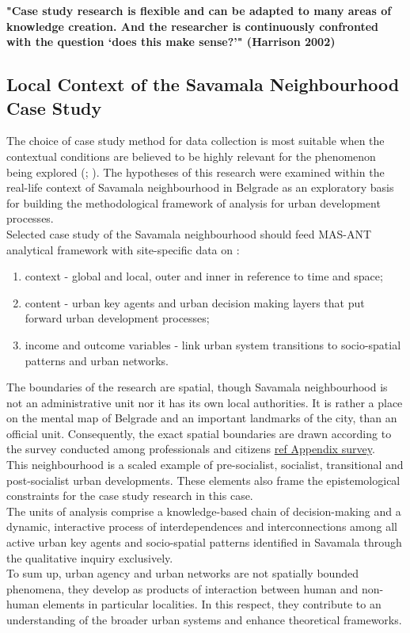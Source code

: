 \documentclass[11pt]{report}
\begin{document}
\textbf{"Case study research is flexible and can be adapted to many areas of knowledge creation. And the researcher is continuously confronted with the question ‘does this make sense?’" (Harrison 2002)}

\subsection{Local Context of the Savamala Neighbourhood Case Study}

The choice of case study method for data collection is most suitable when the  contextual  conditions  are  believed  to  be highly relevant for the phenomenon being explored (\cite{Robson, 1993}; \cite{Yin, 1994}). The hypotheses of this research were examined within the real-life context of Savamala neighbourhood in Belgrade as an exploratory basis for building the methodological framework of analysis for urban development processes. 
\\
Selected case study of the Savamala neighbourhood  should feed MAS-ANT analytical framework with site-specific data on :
\begin{enumerate}
\item context - global and local, outer and inner in reference to time and space;
\item content - urban key agents and urban decision making layers that put forward urban development processes;
\item income and outcome variables - link urban system transitions to socio-spatial patterns and urban networks.
\end{enumerate}

The boundaries of the research are spatial, though Savamala neighbourhood is not an administrative unit nor it has its own local authorities. It is rather a place on the mental map of Belgrade and an important landmarks of the city, than an official unit. Consequently, the exact spatial boundaries are drawn according to the survey conducted among professionals and citizens \href{}{ref Appendix survey}.
\\
This neighbourhood is a scaled example of pre-socialist, socialist, transitional and post-socialist urban developments. These elements also frame the epistemological constraints for the case study research in this case.
\\
The units of analysis comprise a knowledge-based chain of decision-making and a dynamic, interactive process of interdependences and interconnections among all active urban key agents and socio-spatial patterns identified in Savamala through the qualitative inquiry exclusively.
\\
To sum up, urban agency and urban networks are not spatially bounded phenomena, they develop as products of interaction between human and non-human elements in particular localities. In this respect, they contribute to an understanding of the broader urban systems and enhance theoretical frameworks. 
\end{document}

